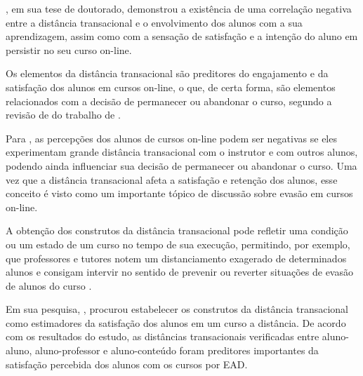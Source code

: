 , em sua tese de doutorado, demonstrou a
existência de uma correlação negativa entre a distância transacional e o
envolvimento dos alunos com a sua aprendizagem, assim como com a sensação de
satisfação e a intenção do aluno em persistir no seu curso on-line.

Os elementos da distância transacional são preditores do engajamento e da
satisfação dos alunos em cursos on-line, o que, de certa forma, são elementos
relacionados com a decisão de permanecer ou abandonar o curso, segundo a revisão
de  do trabalho de
.

Para , as percepções dos alunos de cursos
on-line podem ser negativas se eles experimentam grande distância transacional
com o instrutor e com outros alunos, podendo ainda influenciar sua decisão de
permanecer ou abandonar o curso. Uma vez que a distância transacional afeta a
satisfação e retenção dos alunos, esse conceito é visto como um importante
tópico de discussão sobre evasão em cursos on-line.

A obtenção dos construtos da distância transacional pode refletir uma condição
ou um estado de um curso no tempo de sua execução, permitindo, por exemplo, que
professores e tutores notem um distanciamento exagerado de determinados alunos e
consigam intervir no sentido de prevenir ou reverter situações de evasão de
alunos do curso \cite{horzum2011developing}.

Em sua pesquisa, , procurou estabelecer os
construtos da distância transacional como estimadores da satisfação dos alunos
em um curso a distância. De acordo com os resultados do estudo, as distâncias
transacionais verificadas entre aluno-aluno, aluno-professor e aluno-conteúdo
foram preditores importantes da satisfação percebida dos alunos com os cursos
por EAD.